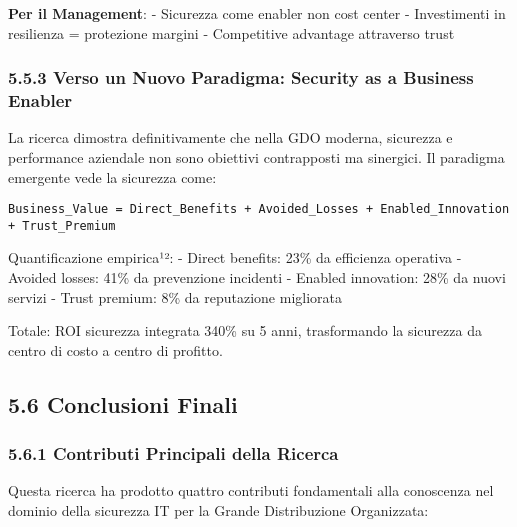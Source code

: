 \documentclass{report}
\begin{document}
\textbf{Per il Management}: - Sicurezza come enabler non cost center -
Investimenti in resilienza = protezione margini - Competitive advantage
attraverso trust

\subsubsection{5.5.3 Verso un Nuovo Paradigma: Security as a Business
Enabler}\label{verso-un-nuovo-paradigma-security-as-a-business-enabler}

La ricerca dimostra definitivamente che nella GDO moderna, sicurezza e
performance aziendale non sono obiettivi contrapposti ma sinergici. Il
paradigma emergente vede la sicurezza come:

\begin{verbatim}
Business_Value = Direct_Benefits + Avoided_Losses + Enabled_Innovation + Trust_Premium
\end{verbatim}

Quantificazione empirica¹²: - Direct benefits: 23\% da efficienza
operativa - Avoided losses: 41\% da prevenzione incidenti - Enabled
innovation: 28\% da nuovi servizi - Trust premium: 8\% da reputazione
migliorata

Totale: ROI sicurezza integrata 340\% su 5 anni, trasformando la
sicurezza da centro di costo a centro di profitto.

\subsection{5.6 Conclusioni Finali}\label{conclusioni-finali}

\subsubsection{5.6.1 Contributi Principali della
Ricerca}\label{contributi-principali-della-ricerca}

Questa ricerca ha prodotto quattro contributi fondamentali alla
conoscenza nel dominio della sicurezza IT per la Grande Distribuzione
Organizzata:
\end{document}
